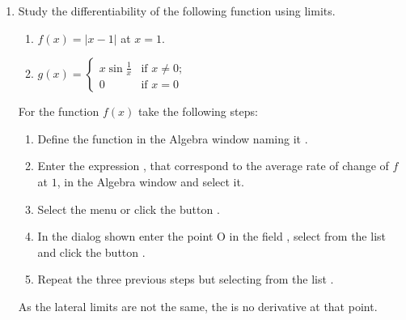 \begin{enumerate}[leftmargin=*]
%


\item Study the differentiability of the following function using limits.
\begin{enumerate}
\item $f(x)=|x-1|$  at $x=1$.
\item $g(x)=
\begin{cases}
x\sin\frac{1}{x} & \mbox{if $x\neq 0$;}\\
0 & \mbox{if $x=0$}
\end{cases}$
\end{enumerate}

\begin{indication}
For the function $f(x)$ take the following steps:
\begin{enumerate}
\item Define the function in the Algebra window naming it .
\item Enter the expression , that correspond to the average rate of change of $f$ at $1$, in the Algebra window and select it.
\item Select the menu  or click the button .
\item In the dialog shown enter the point O in the field , select  from the list  and click the button .
\item Repeat the three previous steps but selecting  from the list .
\end{enumerate}
As the lateral limits are not the same, the is no derivative at that point.


\end{indication}
\end{enumerate}
